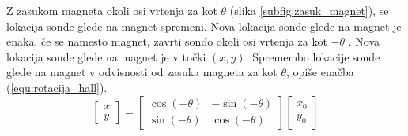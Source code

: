 Z zasukom magneta okoli osi vrtenja za kot $\theta$ (slika \ref{subfig:zasuk_magnet}), se lokacija sonde glede na magnet spremeni. Nova lokacija sonde glede na magnet je enaka, če se namesto magnet, zavrti sondo okoli osi vrtenja za kot $-\theta$ . Nova lokacija
sonde glede na magnet je v točki  $(x, y)$. Spremembo lokacije sonde glede na magnet v odvisnosti od zasuka magneta za kot $\theta$, opiše enačba (\ref{equ:rotacija_hall}).
\begin{equation}
\label{equ:rotacija_hall}
\begin{bmatrix} x\\y \end{bmatrix}=
\begin{bmatrix} \cos(-\theta)&-\sin(-\theta)\\\sin(-\theta)&\cos(-\theta) \end{bmatrix}
\begin{bmatrix} x_0\\y_0 \end{bmatrix}
\end{equation}

